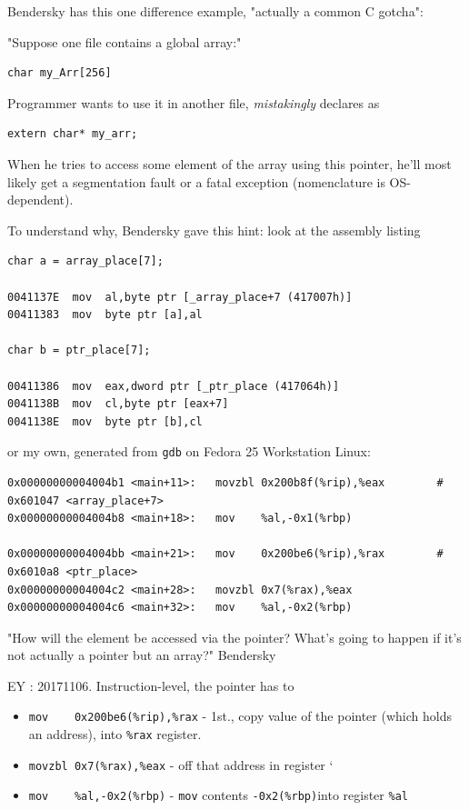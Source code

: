 \documentclass[10pt]{amsart}
\begin{document}
Bendersky \cite{Bend} has this one difference example, "actually a common C gotcha":  

"Suppose one file contains a global array:"  

\begin{lstlisting}
char my_Arr[256]  
\end{lstlisting}

Programmer wants to use it in another file, \emph{mistakingly} declares as  
\begin{lstlisting}
extern char* my_arr; 
\end{lstlisting}

When he tries to access some element of the array using this pointer, he'll most likely get a segmentation fault or a fatal exception (nomenclature is OS-dependent).  

To understand why, Bendersky \cite{Bend} gave this hint:  look at the assembly listing  

\begin{lstlisting}
char a = array_place[7];

0041137E  mov  al,byte ptr [_array_place+7 (417007h)]
00411383  mov  byte ptr [a],al

char b = ptr_place[7];

00411386  mov  eax,dword ptr [_ptr_place (417064h)]
0041138B  mov  cl,byte ptr [eax+7]
0041138E  mov  byte ptr [b],cl
\end{lstlisting}

or my own, generated from \verb|gdb| on Fedora 25 Workstation Linux:

\begin{lstlisting}
0x00000000004004b1 <main+11>:	movzbl 0x200b8f(%rip),%eax        # 0x601047 <array_place+7>
0x00000000004004b8 <main+18>:	mov    %al,-0x1(%rbp)

0x00000000004004bb <main+21>:	mov    0x200be6(%rip),%rax        # 0x6010a8 <ptr_place>
0x00000000004004c2 <main+28>:	movzbl 0x7(%rax),%eax
0x00000000004004c6 <main+32>:	mov    %al,-0x2(%rbp)
\end{lstlisting}

"How will the element be accessed via the pointer?  What's going to happen if it's not actually a pointer but an array?"  Bendersky \cite{Bend}   

EY : 20171106.  Instruction-level, the pointer has to     
\begin{itemize}
	\item \verb|mov    0x200be6(%rip),%rax| - 1st., copy value of the pointer (which holds an address), into \verb|%rax| register.  
	\item \verb|movzbl 0x7(%rax),%eax| - off that address in register `%
	\item \verb|mov    %al,-0x2(%rbp)| - \verb|mov| contents \verb|-0x2(%rbp)|into register \verb|%al|
\end{itemize}
\end{document}
